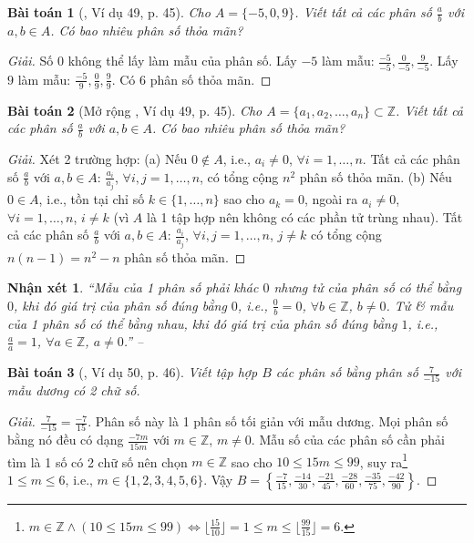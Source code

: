 \documentclass{article}
\newtheorem{baitoan}{Bài toán}
\newtheorem{nhanxet}{Nhận xét}
\begin{document}
\begin{baitoan}[\cite{Tuyen_Toan_6}, Ví dụ 49, p. 45]
	Cho $A = \{-5,0,9\}$. Viết tất cả các phân số $\frac{a}{b}$ với $a,b\in A$. Có bao nhiêu phân số thỏa mãn?
\end{baitoan}

\begin{proof}[Giải]
	Số $0$ không thể lấy làm mẫu của phân số. Lấy $-5$ làm mẫu: $\frac{-5}{-5},\frac{0}{-5},\frac{9}{-5}$. Lấy $9$ làm mẫu: $\frac{-5}{9},\frac{0}{9},\frac{9}{9}$. Có $6$ phân số thỏa mãn.
\end{proof}

\begin{baitoan}[Mở rộng \cite{Tuyen_Toan_6}, Ví dụ 49, p. 45]
	Cho $A = \{a_1,a_2,\ldots,a_n\}\subset\mathbb{Z}$. Viết tất cả các phân số $\frac{a}{b}$ với $a,b\in A$. Có bao nhiêu phân số thỏa mãn?
\end{baitoan}

\begin{proof}[Giải]
	Xét 2 trường hợp: (a) Nếu $0\notin A$, i.e., $a_i\ne0$, $\forall i = 1,\ldots,n$. Tất cả các phân số $\frac{a}{b}$ với $a,b\in A$: $\frac{a_i}{a_j}$, $\forall i,j = 1,\ldots,n$, có tổng cộng $n^2$ phân số thỏa mãn. (b) Nếu $0\in A$, i.e., tồn tại chỉ số $k\in\{1,\ldots,n\}$ sao cho $a_k = 0$, ngoài ra $a_i\ne 0$, $\forall i = 1,\ldots,n$, $i\ne k$ (vì $A$ là 1 tập hợp nên không có các phần tử trùng nhau). Tất cả các phân số $\frac{a}{b}$ với $a,b\in A$: $\frac{a_i}{a_j}$, $\forall i,j = 1,\ldots,n$, $j\ne k$ có tổng cộng $n(n - 1) = n^2 - n$ phân số thỏa mãn.
\end{proof}

\begin{nhanxet}
	``Mẫu của 1 phân số phải khác $0$ nhưng tử của phân số có thể bằng $0$, khi đó giá trị của phân số đúng bằng $0$, i.e., $\frac{0}{b} = 0$, $\forall b\in\mathbb{Z}$, $b\ne 0$. Tử \& mẫu của 1 phân số có thể bằng nhau, khi đó giá trị của phân số đúng bằng $1$, i.e., $\frac{a}{a} = 1$, $\forall a\in\mathbb{Z}$, $a\ne 0$.'' -- \cite[p. 46]{Tuyen_Toan_6}
\end{nhanxet}

\begin{baitoan}[\cite{Tuyen_Toan_6}, Ví dụ 50, p. 46]
	Viết tập hợp $B$ các phân số bằng phân số $\frac{7}{-15}$ với mẫu dương có 2 chữ số.
\end{baitoan}

\begin{proof}[Giải]
	$\frac{7}{-15} = \frac{-7}{15}$. Phân số này là 1 phân số tối giản với mẫu dương. Mọi phân số bằng nó đều có dạng $\frac{-7m}{15m}$ với $m\in\mathbb{Z}$, $m\ne0$. Mẫu số của các phân số cần phải tìm là 1 số có 2 chữ số nên chọn $m\in\mathbb{Z}$ sao cho $10\le15m\le 99$, suy ra\footnote{$m\in\mathbb{Z}\land(10\le15m\le 99)\Leftrightarrow\lfloor\frac{15}{10}\rfloor = 1\le m\le\lfloor\frac{99}{15}\rfloor = 6$.} $1\le m\le6$, i.e., $m\in\{1,2,3,4,5,6\}$. Vậy $B = \left\{\frac{-7}{15},\frac{-14}{30},\frac{-21}{45},\frac{-28}{60},\frac{-35}{75},\frac{-42}{90}\right\}$.
\end{proof}
\end{document}
